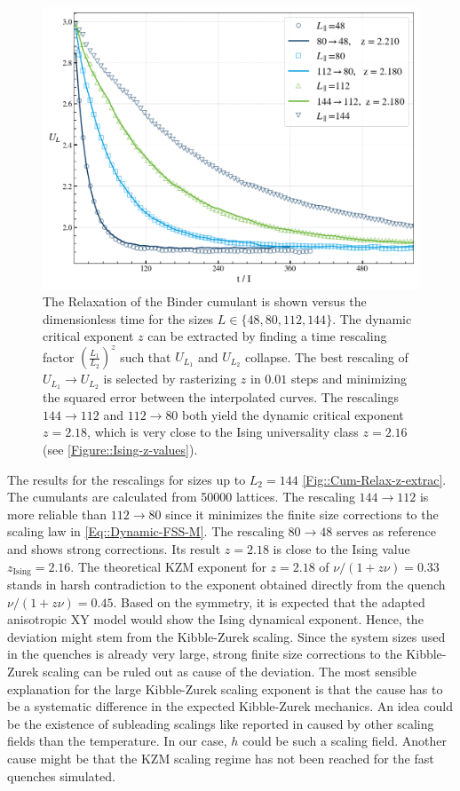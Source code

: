 	\begin{figure}
		\centering
		\includegraphics[width=0.925\linewidth]{graphics/z-2.png}
		\caption{The Relaxation of the Binder cumulant is shown versus the dimensionless time for the sizes  $L	\in \{48, 80, 112, 144\}$. The dynamic critical exponent $z$ can be extracted by finding a time rescaling factor $(\frac{L_1}{L_2})^z$ such that $U_{L_1}$ and $U_{L_2}$ collapse.	The best rescaling of $U_{L_1} \rightarrow U_{L_2}$ is selected by rasterizing $z$ in $0.01$ steps and minimizing the squared error between the interpolated curves. The rescalings $144 \rightarrow 112$ and $112 \rightarrow 80$ both yield the dynamic critical exponent $z = 2.18$, which is very close to the Ising universality class $z=2.16$ (see \autoref{Figure::Ising-z-values}). }
		\label{Fig::Cum-Relax-z-extrac}
	\end{figure}
	The results for the rescalings for sizes up to $L_2 =	144$ \autoref{Fig::Cum-Relax-z-extrac}. The cumulants are calculated from 50000 lattices. The rescaling $144 \rightarrow 112$ is more reliable than $112 \rightarrow 80$ since it minimizes the finite size corrections to the scaling law in  \eqref{Eq::Dynamic-FSS-M}. The rescaling $80 \rightarrow 48$ serves as reference and shows strong corrections. Its result $z =	2.18$ is close to the Ising value $z_{\text{Ising}} = 2.16$. The theoretical KZM exponent for $z=2.18$ of $\nu /	(1 + z\nu) = 0.33	$ stands in harsh contradiction to the exponent obtained directly from the quench $\nu /	(1 + z\nu) = 0.45$. Based on the symmetry, it is expected that the adapted anisotropic XY model would show the Ising dynamical exponent. Hence, the deviation might stem from the Kibble-Zurek scaling. Since the system sizes used in the quenches is already very large, strong finite size corrections to the Kibble-Zurek scaling can be ruled out as cause of the deviation. The most sensible explanation for the large Kibble-Zurek scaling exponent is that the cause has to be a systematic difference in the expected Kibble-Zurek mechanics. An idea could be the existence of subleading scalings like reported in \cite{ladewig2020kibble} caused by other scaling fields than the temperature. In our case, $h$ could be such a scaling field. Another cause might be that the KZM scaling regime has not been reached for the fast quenches simulated. \\
	
